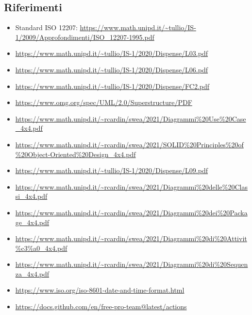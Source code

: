 \subsection{Riferimenti}
\label{ref}
        \begin{itemize}
            \item Standard ISO 12207:  \url{https://www.math.unipd.it/~tullio/IS-1/2009/Approfondimenti/ISO_12207-1995.pdf}
            \item \url{https://www.math.unipd.it/~tullio/IS-1/2020/Dispense/L03.pdf}
            \item \url{https://www.math.unipd.it/~tullio/IS-1/2020/Dispense/L06.pdf}
            \item \url{https://www.math.unipd.it/~tullio/IS-1/2020/Dispense/FC2.pdf}
            \item \url{https://www.omg.org/spec/UML/2.0/Superstructure/PDF}
            \item \url{https://www.math.unipd.it/~rcardin/swea/2021/Diagrammi\%20Use\%20Case_4x4.pdf}
            \item \url{https://www.math.unipd.it/~rcardin/swea/2021/SOLID\%20Principles\%20of\%20Object-Oriented\%20Design_4x4.pdf}
            \item \url{https://www.math.unipd.it/~tullio/IS-1/2020/Dispense/L09.pdf}
            \item \url{https://www.math.unipd.it/~rcardin/swea/2021/Diagrammi\%20delle\%20Classi_4x4.pdf}
            \item \url{https://www.math.unipd.it/~rcardin/swea/2021/Diagrammi\%20dei\%20Package_4x4.pdf}
            \item \url{https://www.math.unipd.it/~rcardin/swea/2021/Diagrammi\%20di\%20Attivit\%c3\%a0_4x4.pdf}
            \item \url{https://www.math.unipd.it/~rcardin/swea/2021/Diagrammi\%20di\%20Sequenza_4x4.pdf}
            \item \url{https://www.iso.org/iso-8601-date-and-time-format.html}
            \item \url{https://docs.github.com/en/free-pro-team@latest/actions}

        \end{itemize}

\pagebreak